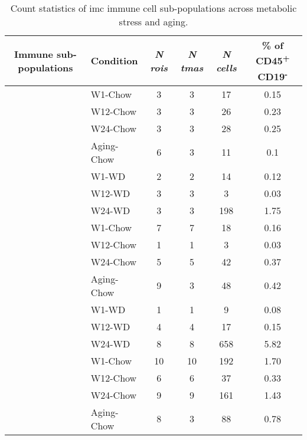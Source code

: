 \begin{table}[ht!]
  \renewcommand{\arraystretch}{1.2} %
  \centering
 \caption[Count statistics of  immune cell sub-populations]{Count statistics of \gls{imc} immune cell sub-populations across metabolic stress and aging.}
     \label{tab:app_imc_macrophages}
  \begin{tabularx}{\textwidth}{CxCCCC}
    \toprule
    \textbf{Immune sub-populations} & \textbf{Condition} & \textit{\textbf{N \glspl{roi}}} & \textit{\textbf{N \glspl{tma}}} & \textit{\textbf{N cells}} & \textbf{\% of CD45\textsuperscript{+} CD19\textsuperscript{-}} \\
    \midrule
     & W1-Chow & 3 & 3 & 17 & 0.15 \\
    & W12-Chow & 3 & 3 & 26 & 0.23 \\
    & W24-Chow & 3 & 3 & 28 & 0.25 \\
    & Aging-Chow & 6 & 3 & 11 & 0.1 \\
    & W1-WD & 2 & 2 & 14 & 0.12 \\
    & W12-WD & 3 & 3 & 3 & 0.03 \\
    & W24-WD & 3 & 3 & 198 & 1.75 \\
    \midrule
     & W1-Chow & 7 & 7 & 18 & 0.16 \\
    & W12-Chow & 1 & 1 & 3 & 0.03 \\
    & W24-Chow & 5 & 5 & 42 & 0.37 \\
    & Aging-Chow & 9 & 3 & 48 & 0.42 \\
    & W1-WD & 1 & 1 & 9 & 0.08 \\
    & W12-WD & 4 & 4 & 17 & 0.15 \\
    & W24-WD & 8 & 8 & 658 & 5.82 \\
    \midrule
     & W1-Chow & 10 & 10 & 192 & 1.70 \\
    & W12-Chow & 6 & 6 & 37 & 0.33 \\
    & W24-Chow & 9 & 9 & 161 & 1.43 \\
    & Aging-Chow & 8 & 3 & 88 & 0.78 \\

\end{tabularx}
\end{table}
